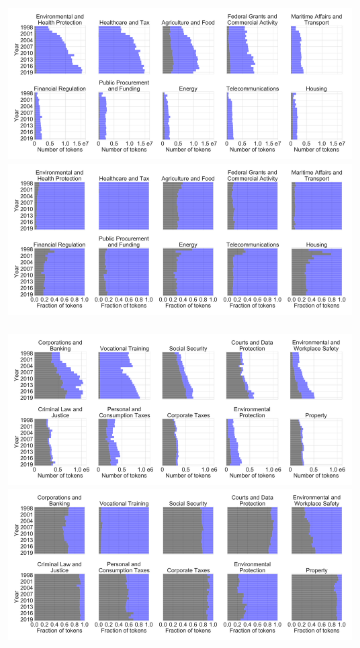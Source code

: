 \documentclass[varwidth, border=0pt]{standalone}
\begin{document}
	
	\begin{figure}
	\centering
\begin{subfigure}{\linewidth}
	\centering
	\vspace*{-6pt}\includegraphics[width=\linewidth]{../../graphics/family-composition-absolute-n100-us.pdf}\vspace{-7pt}
	\vspace*{-6pt}\includegraphics[width=\linewidth]{../../graphics/family-composition-relative-n100-us.pdf}
\end{subfigure}

\begin{subfigure}{\linewidth}
	\includegraphics[width=\linewidth]{../../graphics/family-composition-absolute-n100-de.pdf}\vspace{-7pt}
	\vspace*{-6pt}\includegraphics[width=\linewidth]{../../graphics/family-composition-relative-n100-de.pdf}%
\end{subfigure}
	\end{figure}
	
\end{document}
